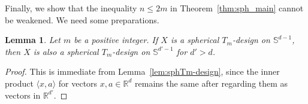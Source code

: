 \documentclass[11pt]{amsart}
\newtheorem{lem}[thm]{Lemma}
\theoremstyle{definition}
\DeclareMathOperator{\Hom}{Hom}
\newcommand{\R}{\mathbb{R}}
\begin{document}
Finally,  we show that the inequality $n\le2m$ in 
Theorem~\ref{thm:sph_main} cannot be weakened.
We need some preparations.



\begin{lem}
\label{lem:embedding}
Let $m$ be a positive integer.
If $X$ is a spherical \( T_m \)-design on \(\mathbb{S}^{d-1} \),
then \( X \) is also a spherical \( T_m \)-design on \(\mathbb{S}^{d'-1} \)
for \( d' > d \).
\end{lem}

\begin{proof}
This is immediate from Lemma~\ref{lem:sphTm-design}, since
the inner product $\langle x,a\rangle$ for vectors $x,a\in\R^d$
remains the same after regarding them as vectors in $\R^{d'}$.
\end{proof}
\end{document}
